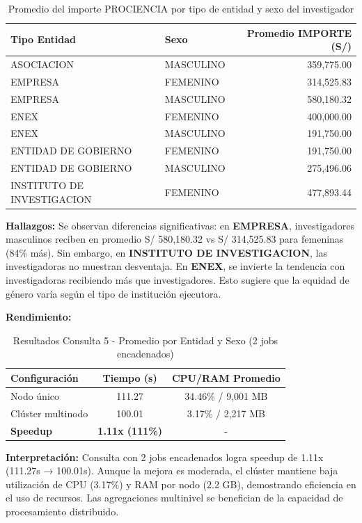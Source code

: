 \documentclass[12pt,a4paper]{article}
\begin{document}
\begin{table}[H]
\centering
\begin{tabular}{llr}
\toprule
\textbf{Tipo Entidad} & \textbf{Sexo} & \textbf{Promedio IMPORTE (S/)} \\
\midrule
ASOCIACION & MASCULINO & 359,775.00 \\
EMPRESA & FEMENINO & 314,525.83 \\
EMPRESA & MASCULINO & 580,180.32 \\
ENEX & FEMENINO & 400,000.00 \\
ENEX & MASCULINO & 191,750.00 \\
ENTIDAD DE GOBIERNO & FEMENINO & 191,750.00 \\
ENTIDAD DE GOBIERNO & MASCULINO & 275,496.06 \\
INSTITUTO DE INVESTIGACION & FEMENINO & 477,893.44 \\
\bottomrule
\end{tabular}
\caption{Promedio del importe PROCIENCIA por tipo de entidad y sexo del investigador}
\label{tab:promedio_entidad_sexo}
\end{table}

\textbf{Hallazgos:} Se observan diferencias significativas: en \textbf{EMPRESA}, investigadores masculinos reciben en promedio S/ 580,180.32 vs S/ 314,525.83 para femeninas (84\% más). Sin embargo, en \textbf{INSTITUTO DE INVESTIGACION}, las investigadoras no muestran desventaja. En \textbf{ENEX}, se invierte la tendencia con investigadoras recibiendo más que investigadores. Esto sugiere que la equidad de género varía según el tipo de institución ejecutora.

\textbf{Rendimiento:}

\begin{table}[H]
\centering
\begin{tabular}{lcc}
\toprule
\textbf{Configuración} & \textbf{Tiempo (s)} & \textbf{CPU/RAM Promedio} \\
\midrule
Nodo único & 111.27 & 34.46\% / 9,001 MB \\
Clúster multinodo & 100.01 & 3.17\% / 2,217 MB \\
\midrule
\textbf{Speedup} & \textbf{1.11x (111\%)} & - \\
\bottomrule
\end{tabular}
\caption{Resultados Consulta 5 - Promedio por Entidad y Sexo (2 jobs encadenados)}
\label{tab:consulta5_perf}
\end{table}

\textbf{Interpretación:} Consulta con 2 jobs encadenados logra speedup de 1.11x (111.27s → 100.01s). Aunque la mejora es moderada, el clúster mantiene baja utilización de CPU (3.17\%) y RAM por nodo (2.2 GB), demostrando eficiencia en el uso de recursos. Las agregaciones multinivel se benefician de la capacidad de procesamiento distribuido.
\end{document}
